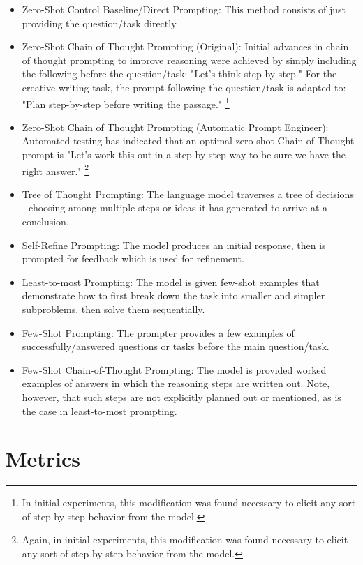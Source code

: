 \documentclass[11pt]{article}
\begin{document}
\begin{itemize}
  \item Zero-Shot Control Baseline/Direct Prompting: This method consists of just providing the question/task directly.
  \item Zero-Shot Chain of Thought Prompting (Original): Initial advances in chain of thought prompting to improve reasoning were achieved by simply including the following before the question/task: "Let's think step by step." \cite{kojima_large_2023} For the creative writing task, the prompt following the question/task is adapted to: "Plan step-by-step before writing the passage." \footnote{In initial experiments, this modification was found necessary to elicit any sort of step-by-step behavior from the model.}
  \item Zero-Shot Chain of Thought Prompting (Automatic Prompt Engineer): Automated testing has indicated that an optimal zero-shot Chain of Thought prompt is "Let's work this out in a step by step way to be sure we have the right answer." \cite{zhou_large_2022} \footnote{Again, in initial experiments, this modification was found necessary to elicit any sort of step-by-step behavior from the model.}
  \item Tree of Thought Prompting: The language model traverses a tree of decisions - choosing among multiple steps or ideas it has generated to arrive at a conclusion. \cite{yao_tree_2023}
  \item Self-Refine Prompting: The model produces an initial response, then is prompted for feedback which is used for refinement. \cite{madaan_self-refine_2023}
  \item Least-to-most Prompting: The model is given few-shot examples that demonstrate how to first break down the task into smaller and simpler subproblems, then solve them sequentially. \cite{zhou_least--most_2023}
  \item Few-Shot Prompting: The prompter provides a few examples of successfully/answered questions or tasks before the main question/task.
  \item Few-Shot Chain-of-Thought Prompting: The model is provided worked examples of answers in which the reasoning steps are written out. \cite{wei_chain--thought_nodate} Note, however, that such steps are not explicitly planned out or mentioned, as is the case in least-to-most prompting.
\end{itemize}

\section*{Metrics}
\end{document}
